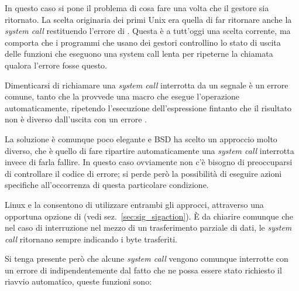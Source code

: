 In questo caso si pone il problema di cosa fare una volta che il gestore sia
ritornato. La scelta originaria dei primi Unix era quella di far ritornare
anche la \textit{system call} restituendo l'errore di . Questa
è a tutt'oggi una scelta corrente, ma comporta che i programmi che usano dei
gestori controllino lo stato di uscita delle funzioni che eseguono una system
call lenta per ripeterne la chiamata qualora l'errore fosse questo.

Dimenticarsi di richiamare una \textit{system call} interrotta da un segnale è
un errore comune, tanto che la  provvede una macro
 che esegue l'operazione automaticamente,
ripetendo l'esecuzione dell'espressione  fintanto che il risultato
non è diverso dall'uscita con un errore .

La soluzione è comunque poco elegante e BSD ha scelto un approccio molto
diverso, che è quello di fare ripartire automaticamente una \textit{system
  call} interrotta invece di farla fallire. In questo caso ovviamente non c'è
bisogno di preoccuparsi di controllare il codice di errore; si perde però la
possibilità di eseguire azioni specifiche all'occorrenza di questa particolare
condizione.

Linux e la  consentono di utilizzare entrambi gli approcci,
attraverso una opportuna opzione di  (vedi
sez.~\ref{sec:sig_sigaction}). È da chiarire comunque che nel caso di
interruzione nel mezzo di un trasferimento parziale di dati, le \textit{system
  call} ritornano sempre indicando i byte trasferiti.

Si tenga presente però che alcune \textit{system call} vengono comunque
interrotte con un errore di  indipendentemente dal fatto che ne
possa essere stato richiesto il riavvio automatico, queste funzioni sono:

